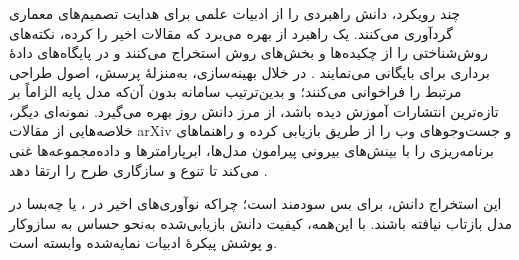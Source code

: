 \subsubsection{\protect{}}

چند رویکرد، دانش راهبردی را از ادبیات علمی برای هدایت تصمیم‌های معماری گردآوری می‌کنند. یک راهبرد از  بهره می‌برد که مقالات اخیر را  کرده، نکته‌های روش‌شناختی را از چکیده‌ها و بخش‌های روش استخراج می‌کنند و در پایگاه‌های دادهٔ برداری برای  بایگانی می‌نمایند \cite{Yang2025NADER}. در خلال بهینه‌سازی،  به‌منزلهٔ پرسش، اصول طراحی مرتبط را فراخوانی می‌کنند؛ و بدین‌ترتیب سامانه بدون آن‌که مدل پایه الزاماً بر تازه‌ترین انتشارات آموزش دیده باشد، از مرز دانش روز بهره می‌گیرد. نمونه‌ای دیگر، خلاصه‌هایی از مقالات arXiv و جست‌وجوهای وب را از طریق  بازیابی کرده و راهنماهای برنامه‌ریزی را با بینش‌های بیرونی پیرامون مدل‌ها، ابرپارامترها و داده‌مجموعه‌ها غنی می‌کند تا تنوع و سازگاری طرح را ارتقا دهد \cite{trirat2025automlagent}.

این استخراج دانش، برای  بس سودمند است؛ چراکه نوآوری‌های اخیر در ،  یا  چه‌بسا در  مدل بازتاب نیافته باشند. با این‌همه، کیفیت دانش بازیابی‌شده به‌نحو حساس به سازوکار  و پوشش پیکرهٔ ادبیات نمایه‌شده وابسته است.

\subsubsection{\protect{}}

